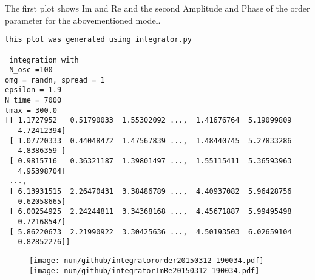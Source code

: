 The first plot shows Im and Re and the second Amplitude and Phase of the order parameter for the abovementioned model.
\begin{verbatim}this plot was generated using integrator.py

 integration with
 N_osc =100
omg = randn, spread = 1
epsilon = 1.9
N_time = 7000
tmax = 300.0
[[ 1.1727952   0.51790033  1.55302092 ...,  1.41676764  5.19099809
   4.72412394]
 [ 1.07720333  0.44048472  1.47567839 ...,  1.48440745  5.27833286
   4.8386359 ]
 [ 0.9815716   0.36321187  1.39801497 ...,  1.55115411  5.36593963
   4.95398704]
 ..., 
 [ 6.13931515  2.26470431  3.38486789 ...,  4.40937082  5.96428756
   0.62058665]
 [ 6.00254925  2.24244811  3.34368168 ...,  4.45671887  5.99495498
   0.72168547]
 [ 5.86220673  2.21990922  3.30425636 ...,  4.50193503  6.02659104
   0.82852276]]\end{verbatim}
\begin{figure}[h!]\centering\texttt{[image: num/github/integratororder20150312-190034.pdf]}\texttt{[image: num/github/integratorImRe20150312-190034.pdf]}\end{figure}
